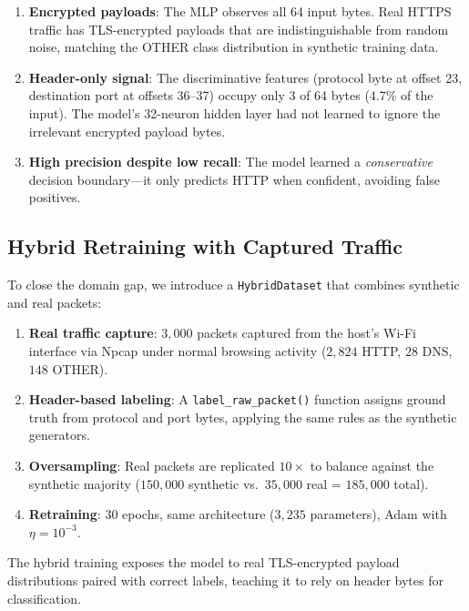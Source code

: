 \documentclass[11pt,a4paper,twoside]{article}
\theoremstyle{definition}
\theoremstyle{remark}
\begin{document}
\begin{enumerate}[leftmargin=*]
  \item \textbf{Encrypted payloads}: The MLP observes all 64 input bytes. Real HTTPS traffic has TLS-encrypted payloads that are indistinguishable from random noise, matching the \textsc{OTHER} class distribution in synthetic training data.

  \item \textbf{Header-only signal}: The discriminative features (protocol byte at offset 23, destination port at offsets 36--37) occupy only 3 of 64 bytes (4.7\% of the input). The model's 32-neuron hidden layer had not learned to ignore the irrelevant encrypted payload bytes.

  \item \textbf{High precision despite low recall}: The model learned a \emph{conservative} decision boundary---it only predicts HTTP when confident, avoiding false positives.
\end{enumerate}

\subsection{Hybrid Retraining with Captured Traffic}
\label{sec:retrain}

To close the domain gap, we introduce a \texttt{HybridDataset} that combines synthetic and real packets:

\begin{enumerate}[leftmargin=*]
  \item \textbf{Real traffic capture}: $3{,}000$ packets captured from the host's Wi-Fi interface via Npcap under normal browsing activity ($2{,}824$ HTTP, $28$ DNS, $148$ OTHER).
  \item \textbf{Header-based labeling}: A \texttt{label\_raw\_packet()} function assigns ground truth from protocol and port bytes, applying the same rules as the synthetic generators.
  \item \textbf{Oversampling}: Real packets are replicated $10\times$ to balance against the synthetic majority ($150{,}000$ synthetic vs.\ $35{,}000$ real = $185{,}000$ total).
  \item \textbf{Retraining}: 30 epochs, same architecture ($3{,}235$ parameters), Adam with $\eta = 10^{-3}$.
\end{enumerate}

\noindent The hybrid training exposes the model to real TLS-encrypted payload distributions paired with correct labels, teaching it to rely on header bytes for classification.
\end{document}
